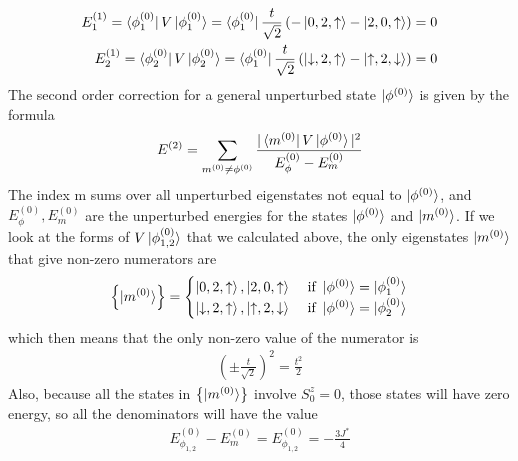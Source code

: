 \documentclass[twoside]{report}
\numberwithin{equation}{section}
\begin{document}
\begin{equation}\begin{aligned}
	E_1^{(1)} = \bra{\phi_1^{(0)}} V \ket{\phi_1^{(0)}} = \bra{\phi_1^{(0)}}\frac{t}{\sqrt 2}\left(-\ket{0, 2 ,\uparrow} - \ket{2, 0, \uparrow}\right)  = 0\\
	E_2^{(1)} = \bra{\phi_2^{(0)}} V \ket{\phi_2^{(0)}} = \bra{\phi_1^{(0)}}\frac{t}{\sqrt 2}\left(\ket{\downarrow, 2 ,\uparrow} - \ket{\uparrow, 2, \downarrow}\right)  = 0
\end{aligned}\end{equation}
The second order correction for a general unperturbed state \(\ket{\phi^{(0)}}\) is given by the formula
\begin{equation}\begin{aligned}
	E^{(2)} = \sum_{m^{(0)}\neq\phi^{(0)}}\frac{|\bra{m^{(0)}}V\ket{\phi^{(0)}}|^2}{E^{(0)}_\phi - E^{(0)}_m}
\end{aligned}\end{equation}
The index m sums over all unperturbed eigenstates not equal to \(\ket{\phi^{(0)}}\), and \(E^{(0)}_\phi, E^{(0)}_m\) are the unperturbed energies for the states \(\ket{\phi^{(0)}}\) and \(\ket{m^{(0)}}\). If we look at the forms of \(V\ket{\phi_{1,2}^{(0)}}\) that we calculated above, the only eigenstates \(\ket{m^{(0)}}\) that give non-zero numerators are
\begin{equation}\begin{aligned}
	\left\{\ket{m^{(0)}}\right\} = \begin{cases}
		\ket{0, 2 ,\uparrow}, \ket{2, 0, \uparrow} & \text{ if }\ket{\phi^{(0)}} = \ket{\phi_1^{(0)}} \\
		\ket{\downarrow, 2 ,\uparrow}, \ket{\uparrow, 2, \downarrow} & \text{ if }\ket{\phi^{(0)}} = \ket{\phi_2^{(0)}}\\
	\end{cases}
\end{aligned}\end{equation}
which then means that the only non-zero value of the numerator is
\begin{equation}\begin{aligned}
	\left( \pm \frac{t}{\sqrt 2} \right) ^2 = \frac{t^2}{2}
\end{aligned}\end{equation}
Also, because all the states in \(\left\{ \ket{m^{(0)}} \right\} \) involve \(S_0^z = 0\), those states will have zero energy, so all the denominators will have the value
\begin{equation}\begin{aligned}
	E_{\phi_{1,2}}^{(0)} - E_m^{(0)} = E_{\phi_{1,2}}^{(0)} = -\frac{3J^*}{4}
\end{aligned}\end{equation}
\end{document}
